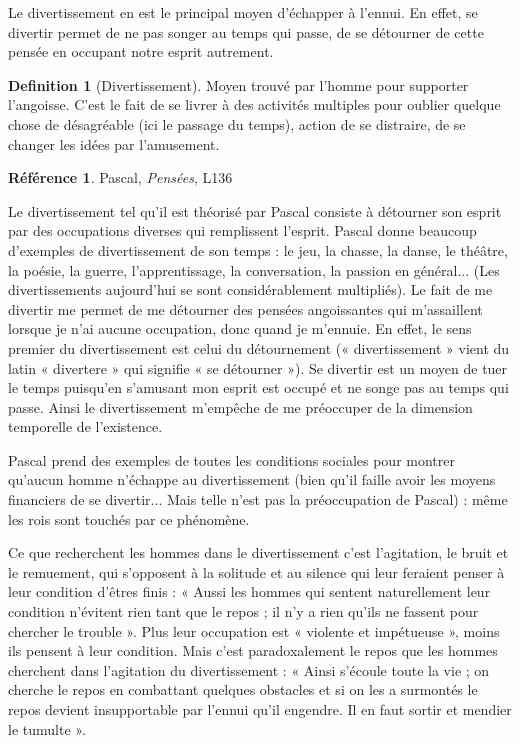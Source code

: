 \documentclass[french]{book}
\theoremstyle{definition}
\newtheorem*{dfn}{Definition}
\newtheorem*{refe}{Référence}
\begin{document}
Le divertissement en est le principal moyen d’échapper à l’ennui. En effet, se divertir permet de ne pas songer au temps qui passe, de se détourner de cette pensée en occupant notre esprit autrement.

\begin{dfn}[Divertissement]
Moyen trouvé par l’homme pour supporter l’angoisse. C’est le fait de se livrer à des activités multiples pour oublier quelque chose de désagréable (ici le passage du temps), action de se distraire, de se changer les idées par l’amusement.
\end{dfn}

\begin{refe}
	Pascal, \textit{Pensées}, L136
\end{refe}

Le divertissement tel qu’il est théorisé par Pascal consiste à détourner son esprit par des occupations diverses qui remplissent l’esprit. Pascal donne beaucoup d’exemples de divertissement de son temps : le jeu, la chasse, la danse, le théâtre, la poésie, la guerre, l’apprentissage, la conversation, la passion en général... (Les divertissements aujourd'hui se sont considérablement multipliés). Le fait de me divertir me permet de me détourner des pensées angoissantes qui m’assaillent lorsque je n’ai aucune occupation, donc quand je m’ennuie. En effet, le sens premier du divertissement est celui du détournement (« divertissement » vient du latin « divertere » qui signifie « se détourner »). Se divertir est un moyen de tuer le temps puisqu’en s’amusant mon esprit est occupé et ne songe pas au temps qui passe. Ainsi le divertissement m’empêche de me préoccuper de la dimension temporelle de l’existence.

Pascal prend des exemples de toutes les conditions sociales pour montrer qu’aucun homme n’échappe au divertissement (bien qu’il faille avoir les moyens financiers de se divertir... Mais telle n’est pas la préoccupation de Pascal) : même les rois sont touchés par ce phénomène.

Ce que recherchent les hommes dans le divertissement c’est l’agitation, le bruit et le remuement, qui s’opposent à la solitude et au silence qui leur feraient penser à leur condition d’êtres finis : « Aussi les hommes qui sentent naturellement leur condition n’évitent rien tant que le repos ; il n’y a rien qu’ils ne fassent pour chercher le trouble ». Plus leur occupation est « violente et impétueuse », moins ils pensent à leur condition. Mais c’est paradoxalement le repos que les hommes cherchent dans l’agitation du divertissement : « Ainsi s’écoule toute la vie ; on cherche le repos en combattant quelques obstacles et si on les a surmontés le repos devient insupportable par l’ennui qu’il engendre. Il en faut sortir et mendier le tumulte ».
\end{document}

